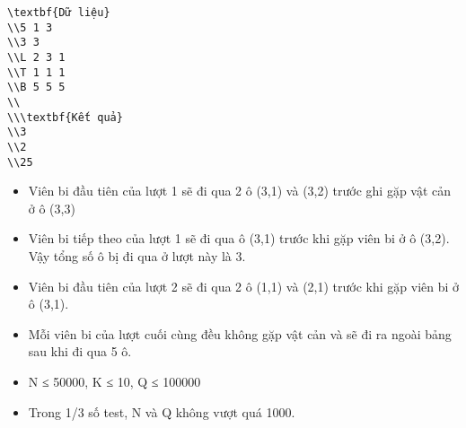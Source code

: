 \begin{verbatim}
\textbf{Dữ liệu}
\\5 1 3
\\3 3
\\L 2 3 1
\\T 1 1 1
\\B 5 5 5
\\
\\\textbf{Kết quả}
\\3
\\2
\\25\end{verbatim}
\begin{itemize}
	\item     Viên bi đầu tiên của lượt 1 sẽ đi qua 2 ô (3,1) và (3,2) trước ghi gặp vật cản ở ô (3,3)   
	\item     Viên bi tiếp theo của lượt 1 sẽ đi qua ô (3,1) trước khi gặp viên bi ở ô (3,2). Vậy tổng số ô bị đi qua ở lượt này là 3.   
	\item     Viên bi đầu tiên của lượt 2 sẽ đi qua 2 ô (1,1) và (2,1) trước khi gặp viên bi ở ô (3,1).   
	\item     Mỗi viên bi của lượt cuối cùng đều không gặp vật cản và sẽ đi ra ngoài bảng sau khi đi qua 5 ô.   
\end{itemize}
\begin{itemize}
	\item     N ≤ 50000, K ≤ 10, Q ≤ 100000   
	\item     Trong 1/3 số test, N và Q không vượt quá 1000.   
\end{itemize}